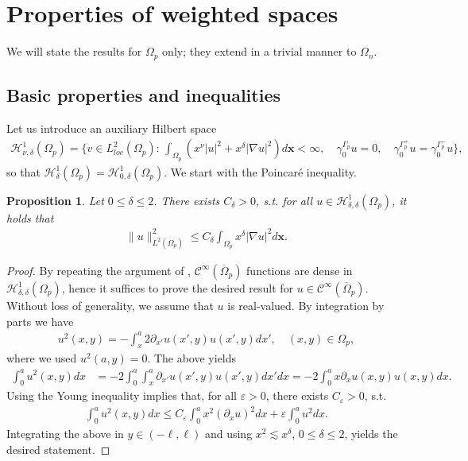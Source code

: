 \documentclass[report]{elsarticle}
\newtheorem{proposition}[theorem]{Proposition}
\numberwithin{theorem}{section}
\renewcommand{\vec}[1]{\mathbf{#1}}
\begin{document}
 





\section{Properties of weighted spaces}
\label{appendix:weighted}
We will state the results for $\Omega_p$ only; they extend in a trivial manner to $\Omega_n$. 
\subsection{Basic properties and inequalities}
Let us introduce an auxiliary Hilbert space
\begin{align*} 
			\mathcal{H}^1_{\nu,\delta}(\Omega_p)=\{v\in L^2_{loc}(\Omega_p): \, \int_{\Omega_p}(x^{\nu}|u|^2+x^{\delta}|\nabla u|^2)d\vec{x}<\infty, \quad \gamma_0^{\Gamma_p}u=0, \quad \gamma_0^{\Gamma_p^+}u=\gamma_0^{\Gamma_p^{-}}u\},
\end{align*}
so that $\mathcal{H}^1_{\delta}(\Omega_p)=\mathcal{H}^1_{0,\delta}(\Omega_p)$. We start with the Poincar\'e inequality. 
\begin{proposition}%
	\label{prop:poincare_appendix}
	Let $0\leq \delta\leq 2$. There exists $C_{\delta}>0$, s.t. for all $u\in \mathcal{H}^1_{\delta,\delta}(\Omega_p)$, 
	it holds that 
	\begin{align*}
		\|u\|_{L^2(\Omega_p)}^2\leq C_{\delta}	\int_{\Omega_p}x^{\delta}|\nabla u|^2d\vec{x}.
	\end{align*}
\end{proposition}
\begin{proof}
	By repeating the argument of \cite[Theorem 7.2]{kufner}, $\mathcal{C}^{\infty}(\overline{\Omega}_p)$ functions are dense in $\mathcal{H}^1_{\delta,\delta}(\Omega_p)$, hence it suffices to prove the desired result for $u\in \mathcal{C}^{\infty}(\overline{\Omega}_p)$. Without loss of generality, we assume that $u$ is real-valued. By integration by parts we have
	\begin{align*}
		u^2(x,y)=-\int_{x}^a 2\partial_{x'}u(x',y)u(x',y)dx', \quad (x,y)\in \Omega_p,
	\end{align*}
	where we used $u^2(a, y)=0$. The above yields 
	\begin{align*}
		\int_0^a u^2(x,y)dx&=-2\int_0^a\int_x^a \partial_{x'} u(x',y)u(x',y)dx' dx%
	=-2\int_0^a x\partial_x u(x,y)u(x,y)dx.
	\end{align*}
	Using the Young inequality implies that, for all $\varepsilon>0$,  there exists $C_{\varepsilon}>0$, s.t. 
	\begin{align*}
		\int_0^a u^2(x,y)dx\leq C_{\varepsilon}\int_0^a x^2(\partial_x u)^2 dx +\varepsilon\int_0^a u^2 dx. 
	\end{align*}
	Integrating the above in $y\in (-\ell,\ell)$ and using $x^2\lesssim x^{\delta}$, $0\leq\delta\leq 2$,  yields the desired statement. 
\end{proof}
\end{document}
